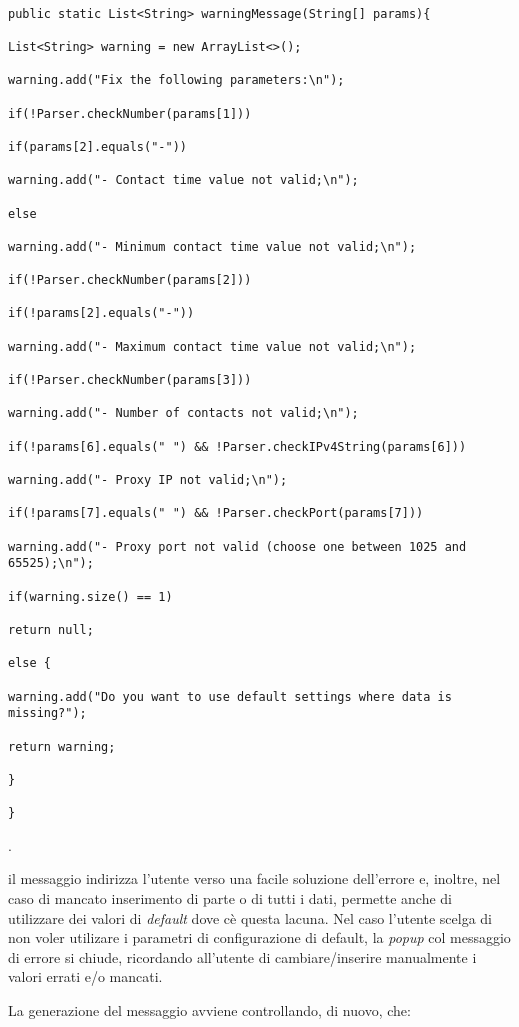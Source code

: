 \begin{lstlisting}

public static List<String> warningMessage(String[] params){

List<String> warning = new ArrayList<>(); 

warning.add("Fix the following parameters:\n");

if(!Parser.checkNumber(params[1]))

if(params[2].equals("-"))

warning.add("- Contact time value not valid;\n");

else

warning.add("- Minimum contact time value not valid;\n");

if(!Parser.checkNumber(params[2]))

if(!params[2].equals("-"))

warning.add("- Maximum contact time value not valid;\n");

if(!Parser.checkNumber(params[3]))

warning.add("- Number of contacts not valid;\n");

if(!params[6].equals(" ") && !Parser.checkIPv4String(params[6]))

warning.add("- Proxy IP not valid;\n");

if(!params[7].equals(" ") && !Parser.checkPort(params[7]))

warning.add("- Proxy port not valid (choose one between 1025 and 65525);\n");

if(warning.size() == 1)

return null;

else {

warning.add("Do you want to use default settings where data is missing?");

return warning;

}

}

\end{lstlisting}.

il messaggio indirizza l'utente verso una facile soluzione dell'errore e, inoltre, nel caso di mancato inserimento di parte o di tutti i dati, permette anche di utilizzare dei valori di \textit{default} dove c\`{e} questa lacuna. Nel caso l'utente scelga di non voler utilizare i parametri di configurazione di default, la \textit{popup} col messaggio di errore si chiude, ricordando all'utente di cambiare/inserire manualmente i valori errati e/o mancati.

La generazione del messaggio avviene controllando, di nuovo, che:

